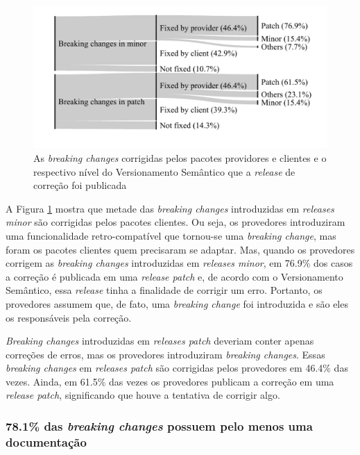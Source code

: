 \begin{figure}
	\centering
	\includegraphics[scale=0.8]{figuras/semver_fixed_prov.pdf}
	\caption{As \textit{breaking changes} corrigidas pelos pacotes providores e clientes e o respectivo nível do Versionamento Semântico que a \textit{release} de correção foi publicada}
	\label{fig:semver_fixed}
\end{figure}{}

A Figura \ref{fig:semver_fixed} mostra que metade das \textit{breaking changes} introduzidas em \textit{releases minor} são corrigidas pelos pacotes clientes. Ou seja, os provedores introduziram uma funcionalidade retro-compatível que tornou-se uma \textit{breaking change}, mas foram os pacotes clientes quem precisaram se adaptar. Mas, quando os provedores corrigem as \textit{breaking changes} introduzidas em \textit{releases minor}, em 76.9\% dos casos a correção é publicada em uma \textit{release patch} e, de acordo com o Versionamento Semântico, essa \textit{release} tinha a finalidade de corrigir um erro. Portanto, os provedores assumem que, de fato, uma \textit{breaking change} foi introduzida e são eles os responsáveis pela correção.

\textit{Breaking changes} introduzidas em \textit{releases patch} deveriam conter apenas correções de erros, mas os provedores introduziram \textit{breaking changes}. Essas \textit{breaking changes} em \textit{releases patch} são corrigidas pelos provedores em 46.4\% das vezes. Ainda, em 61.5\% das vezes os provedores publicam a correção em uma \textit{release patch}, significando que houve a tentativa de corrigir algo.

\subsubsection{78.1\% das \textit{breaking changes} possuem pelo menos uma documentação}

